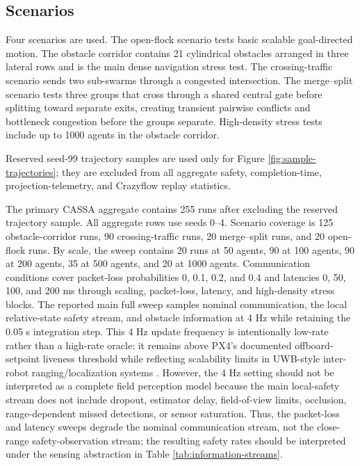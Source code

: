 \documentclass[11pt]{article}
\begin{document}
\subsection{Scenarios}

Four scenarios are used. The open-flock scenario tests basic scalable goal-directed motion. The obstacle corridor contains 21 cylindrical obstacles arranged in three lateral rows and is the main dense navigation stress test. The crossing-traffic scenario sends two sub-swarms through a congested intersection. The merge--split scenario tests three groups that cross through a shared central gate before splitting toward separate exits, creating transient pairwise conflicts and bottleneck congestion before the groups separate. High-density stress tests include up to 1000 agents in the obstacle corridor.

Reserved seed-99 trajectory samples are used only for Figure \ref{fig:sample-trajectories}; they are excluded from all aggregate safety, completion-time, projection-telemetry, and Crazyflow replay statistics.

The primary CASSA aggregate contains 255 runs after excluding the reserved trajectory sample. All aggregate rows use seeds 0--4. Scenario coverage is 125 obstacle-corridor runs, 90 crossing-traffic runs, 20 merge--split runs, and 20 open-flock runs. By scale, the sweep contains 20 runs at 50 agents, 90 at 100 agents, 90 at 200 agents, 35 at 500 agents, and 20 at 1000 agents. Communication conditions cover packet-loss probabilities 0, 0.1, 0.2, and 0.4 and latencies 0, 50, 100, and 200 ms through scaling, packet-loss, latency, and high-density stress blocks. The reported main full sweep samples nominal communication, the local relative-state safety stream, and obstacle information at 4 Hz while retaining the 0.05 s integration step. This 4 Hz update frequency is intentionally low-rate rather than a high-rate oracle: it remains above PX4's documented offboard-setpoint liveness threshold while reflecting scalability limits in UWB-style inter-robot ranging/localization systems \cite{px4offboard2026,shalaby2024passiveuwb}. However, the 4 Hz setting should not be interpreted as a complete field perception model because the main local-safety stream does not include dropout, estimator delay, field-of-view limits, occlusion, range-dependent missed detections, or sensor saturation. Thus, the packet-loss and latency sweeps degrade the nominal communication stream, not the close-range safety-observation stream; the resulting safety rates should be interpreted under the sensing abstraction in Table \ref{tab:information-streams}.
\end{document}
